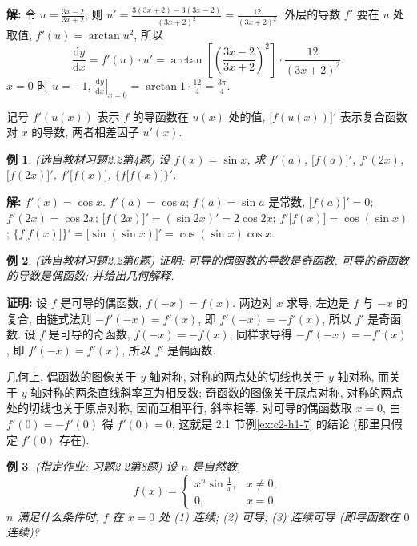\documentclass[UTF8,openany]{ctexbook}
\theoremstyle{chinesetextbook}
\newtheorem{example}{例}[section]
\newenvironment{cnproof}{\par\indent\textbf{证明:} \ignorespaces}{\par}
\newenvironment{cnsolution}{\par\indent\textbf{解:} \ignorespaces}{\par}
\newcommand{\dd}{\mathrm d}
\begin{document}
\begin{cnsolution}
令 $\displaystyle u=\frac{3x-2}{3x+2}$, 则 $\displaystyle u'=\frac{3(3x+2)-3(3x-2)}{(3x+2)^2}=\frac{12}{(3x+2)^2}$. 外层的导数 $f'$ 要在 $u$ 处取值, $f'(u)=\arctan u^2$, 所以
\[
\frac{\dd y}{\dd x}=f'(u)\cdot u'=\arctan\left[\left(\frac{3x-2}{3x+2}\right)^2\right]\cdot\frac{12}{(3x+2)^2}.
\]
$x=0$ 时 $u=-1$, $\displaystyle\left.\frac{\dd y}{\dd x}\right|_{x=0}=\arctan1\cdot\frac{12}4=\frac{3\pi}4$.
\end{cnsolution}
记号 $f'(u(x))$ 表示 $f$ 的导函数在 $u(x)$ 处的值, $\bigl[f(u(x))\bigr]'$ 表示复合函数对 $x$ 的导数, 两者相差因子 $u'(x)$.
\begin{example}\label{ex:c2-h2-4}
\textnormal{(选自教材习题2.2第4题)} 设 $f(x)=\sin x$, 求 $f'(a)$, $\bigl[f(a)\bigr]'$, $f'(2x)$, $\bigl[f(2x)\bigr]'$, $f'\bigl[f(x)\bigr]$, $\bigl\{f\bigl[f(x)\bigr]\bigr\}'$.
\end{example}
\begin{cnsolution}
$f'(x)=\cos x$. $f'(a)=\cos a$; $f(a)=\sin a$ 是常数, $\bigl[f(a)\bigr]'=0$; $f'(2x)=\cos2x$; $\bigl[f(2x)\bigr]'=(\sin2x)'=2\cos2x$; $f'\bigl[f(x)\bigr]=\cos(\sin x)$; $\bigl\{f\bigl[f(x)\bigr]\bigr\}'=\bigl[\sin(\sin x)\bigr]'=\cos(\sin x)\cos x$.
\end{cnsolution}
\begin{example}\label{ex:c2-h2-6}
\textnormal{(选自教材习题2.2第6题)} 证明: 可导的偶函数的导数是奇函数, 可导的奇函数的导数是偶函数; 并给出几何解释.
\end{example}
\begin{cnproof}
设 $f$ 是可导的偶函数, $f(-x)=f(x)$. 两边对 $x$ 求导, 左边是 $f$ 与 $-x$ 的复合, 由链式法则 $-f'(-x)=f'(x)$, 即 $f'(-x)=-f'(x)$, 所以 $f'$ 是奇函数. 设 $f$ 是可导的奇函数, $f(-x)=-f(x)$, 同样求导得 $-f'(-x)=-f'(x)$, 即 $f'(-x)=f'(x)$, 所以 $f'$ 是偶函数.
\end{cnproof}
几何上, 偶函数的图像关于 $y$ 轴对称, 对称的两点处的切线也关于 $y$ 轴对称, 而关于 $y$ 轴对称的两条直线斜率互为相反数; 奇函数的图像关于原点对称, 对称的两点处的切线也关于原点对称, 因而互相平行, 斜率相等. 对可导的偶函数取 $x=0$, 由 $f'(0)=-f'(0)$ 得 $f'(0)=0$, 这就是 2.1 节例\ref{ex:c2-h1-7} 的结论 (那里只假定 $f'(0)$ 存在).
\begin{example}\label{ex:c2-h2-8}
\textnormal{(指定作业: 习题2.2第8题)} 设 $n$ 是自然数,
\[
f(x)=\begin{cases}x^n\sin\frac1x,&x\ne0,\\0,&x=0.\end{cases}
\]
$n$ 满足什么条件时, $f$ 在 $x=0$ 处 (1) 连续; (2) 可导; (3) 连续可导 (即导函数在 $0$ 连续)?
\end{example}
\end{document}
